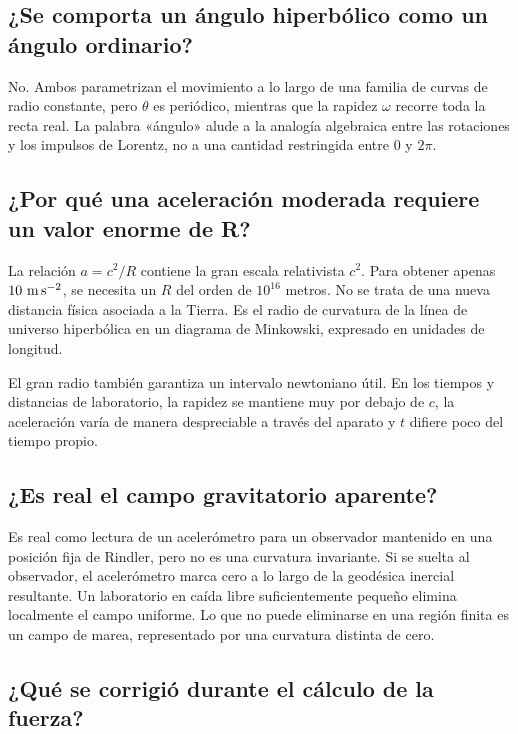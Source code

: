 \subsection{¿Se comporta un ángulo hiperbólico como un ángulo ordinario?}

No. Ambos parametrizan el movimiento a lo largo de una familia de curvas de radio constante, pero \(\theta\) es periódico, mientras que la rapidez \(\omega\) recorre toda la recta real. La palabra «ángulo» alude a la analogía algebraica entre las rotaciones y los impulsos de Lorentz, no a una cantidad restringida entre \(0\) y \(2\pi\).

\subsection{¿Por qué una aceleración moderada requiere un valor enorme de R?}

La relación \(a=c^2/R\) contiene la gran escala relativista \(c^2\). Para obtener apenas \(10\ {\rm m\,s^{-2}}\), se necesita un \(R\) del orden de \(10^{16}\) metros. No se trata de una nueva distancia física asociada a la Tierra. Es el radio de curvatura de la línea de universo hiperbólica en un diagrama de Minkowski, expresado en unidades de longitud.

El gran radio también garantiza un intervalo newtoniano útil. En los tiempos y distancias de laboratorio, la rapidez se mantiene muy por debajo de \(c\), la aceleración varía de manera despreciable a través del aparato y \(t\) difiere poco del tiempo propio.

\subsection{¿Es real el campo gravitatorio aparente?}

Es real como lectura de un acelerómetro para un observador mantenido en una posición fija de Rindler, pero no es una curvatura invariante. Si se suelta al observador, el acelerómetro marca cero a lo largo de la geodésica inercial resultante. Un laboratorio en caída libre suficientemente pequeño elimina localmente el campo uniforme. Lo que no puede eliminarse en una región finita es un campo de marea, representado por una curvatura distinta de cero.

\subsection{¿Qué se corrigió durante el cálculo de la fuerza?}

